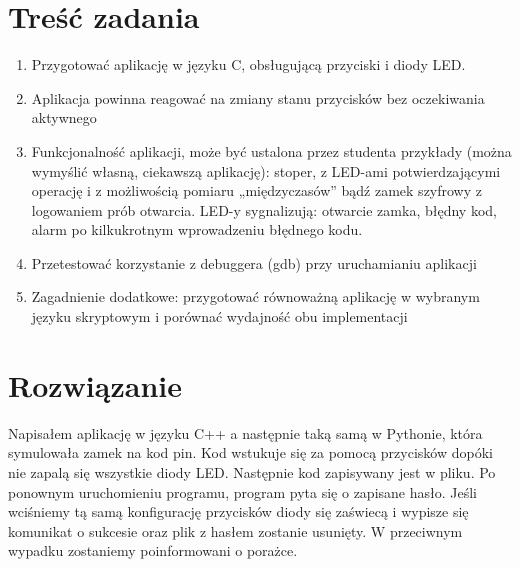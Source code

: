 
\usepackage{listings}

\maketitle
\tableofcontents
\newpage

\section{Treść zadania}
\begin{enumerate}
\item Przygotować aplikację w języku C, obsługującą przyciski i diody LED.
\item Aplikacja powinna reagować na zmiany stanu przycisków bez oczekiwania aktywnego
\item Funkcjonalność aplikacji, może być ustalona przez studenta przykłady 
(można wymyślić własną, ciekawszą aplikację): stoper, z LED-ami potwierdzającymi operację i
z możliwością pomiaru „międzyczasów” bądź zamek szyfrowy z logowaniem prób otwarcia. LED-y sygnalizują:
otwarcie zamka, błędny kod, alarm po kilkukrotnym wprowadzeniu błędnego kodu.
\item Przetestować korzystanie z debuggera (gdb) przy uruchamianiu aplikacji
\item Zagadnienie dodatkowe: przygotować równoważną aplikację w wybranym języku skryptowym i porównać
wydajność obu implementacji
\end{enumerate}

\section{Rozwiązanie}
Napisałem aplikację w języku C++ a następnie taką samą w Pythonie, która symulowała zamek na kod pin.
Kod wstukuje się za pomocą przycisków dopóki nie zapalą się wszystkie diody LED. Następnie kod 
zapisywany jest w pliku. Po ponownym uruchomieniu programu, program pyta się o zapisane hasło. Jeśli
wciśniemy tą samą konfigurację przycisków diody się zaświecą i wypisze się komunikat o sukcesie oraz
plik z hasłem zostanie usunięty. W przeciwnym wypadku zostaniemy poinformowani o porażce.


